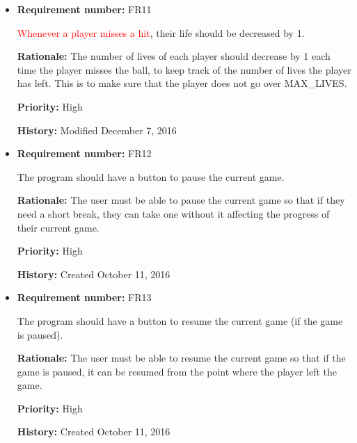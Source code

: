 \documentclass[12pt,letterpaper]{article}
\begin{document}
\begin{reqbox}
	\begin{itemize}

		\item \textbf{Requirement number: }FR11

		\textcolor{red}{Whenever a player misses a hit}, their life should be decreased by 1.

		\textbf{Rationale: }The number of lives of each player should decrease by 1 each time the player misses the ball, to keep track of the number of lives the player has left. This is to make sure that the player does not go over MAX_LIVES.

		\textbf{Priority: }High

		\textbf{History: }Modified December 7, 2016
	\end{itemize}
\end{reqbox}

\begin{reqbox}
	\begin{itemize}

		\item \textbf{Requirement number: }FR12

		The program should have a button to pause the current game.

		\textbf{Rationale: }The user must be able to pause the current game so that if they need a short break, they can take one without it affecting the progress of their current game.

		\textbf{Priority: }High

		\textbf{History: }Created October 11, 2016
	\end{itemize}
\end{reqbox}

\begin{reqbox}
	\begin{itemize}
		\item \textbf{Requirement number: }FR13

		The program should have a button to resume the current game (if the game is paused).

		\textbf{Rationale: }The user must be able to resume the current game so that if the game is paused, it can be resumed from the point where the player left the game.

		\textbf{Priority: }High
	
		\textbf{History: }Created October 11, 2016
	\end{itemize}
\end{reqbox}
\end{document}
